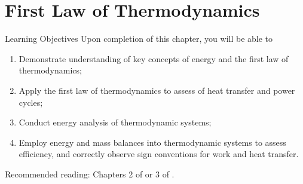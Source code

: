 
\chapter{First Law of Thermodynamics}\label{Chapter:FirstLaw}

   \begin{LearningObjectivesBlock}{Learning Objectives}
      Upon completion of this chapter, you will be able to
        \begin{enumerate}
           \item Demonstrate understanding of key concepts of energy and the first law of thermodynamics;
           \item Apply the first law of thermodynamics to assess of heat transfer and power cycles;
           \item Conduct energy analysis of thermodynamic systems;
           \item Employ energy and mass balances into thermodynamic systems to assess efficiency, and correctly observe sign conventions for work and heat transfer.
        \end{enumerate}
\medskip
     Recommended reading: Chapters 2 of \citet{Atkins_Book,SmithVanNess_Book,Moran_Book} or 3 of \citet{Borgnakke_Book}.
   \end{LearningObjectivesBlock}

